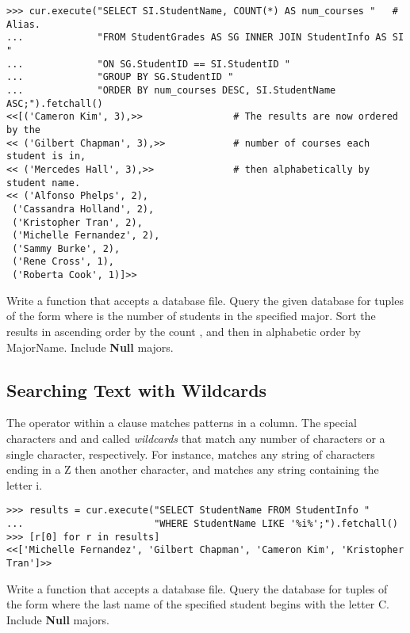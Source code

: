 \begin{lstlisting}
>>> cur.execute("SELECT SI.StudentName, COUNT(*) AS num_courses "   # Alias.
...             "FROM StudentGrades AS SG INNER JOIN StudentInfo AS SI "
...             "ON SG.StudentID == SI.StudentID "
...             "GROUP BY SG.StudentID "
...             "ORDER BY num_courses DESC, SI.StudentName ASC;").fetchall()
<<[('Cameron Kim', 3),>>                # The results are now ordered by the
<< ('Gilbert Chapman', 3),>>            # number of courses each student is in,
<< ('Mercedes Hall', 3),>>              # then alphabetically by student name.
<< ('Alfonso Phelps', 2),
 ('Cassandra Holland', 2),
 ('Kristopher Tran', 2),
 ('Michelle Fernandez', 2),
 ('Sammy Burke', 2),
 ('Rene Cross', 1),
 ('Roberta Cook', 1)]>>
\end{lstlisting}

\begin{problem} %
Write a function that accepts a database file.
Query the given database for tuples of the form  where  is the number of students in the specified major.
Sort the results in ascending order by the count , and then in alphabetic order by MajorName.
Include \textbf{Null} majors.
\end{problem}

\subsection*{Searching Text with Wildcards} %

The  operator within a  clause matches patterns in a  column.
The special characters \lsql{\%} and \lsql{_} and called \emph{wildcards} that match any number of characters or a single character, respectively.
For instance,  matches any string of characters ending in a Z then another character, and  matches any string containing the letter i.

\begin{lstlisting}
>>> results = cur.execute("SELECT StudentName FROM StudentInfo "
...                       "WHERE StudentName LIKE '%i%';").fetchall()
>>> [r[0] for r in results]
<<['Michelle Fernandez', 'Gilbert Chapman', 'Cameron Kim', 'Kristopher Tran']>>
\end{lstlisting}

\begin{problem} %
Write a function that accepts a database file.
Query the database for tuples of the form  where the last name of the specified student begins with the letter C.
Include \textbf{Null} majors.
\end{problem}

